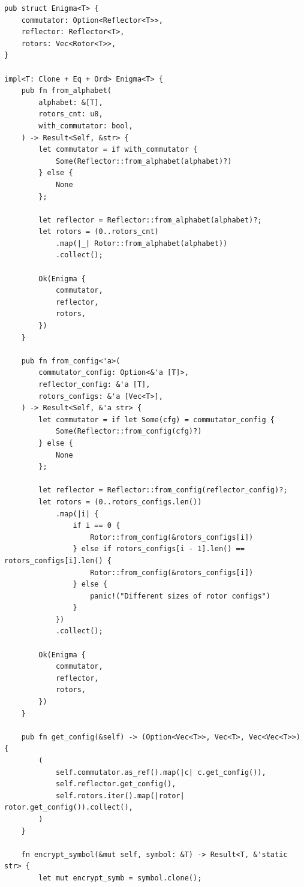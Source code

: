 \begin{center}
\captionsetup{justification=raggedright,singlelinecheck=off}
\begin{lstlisting}[label=lst:enigma,caption=реализация Энигмы]
pub struct Enigma<T> {
    commutator: Option<Reflector<T>>,
    reflector: Reflector<T>,
    rotors: Vec<Rotor<T>>,
}

impl<T: Clone + Eq + Ord> Enigma<T> {
    pub fn from_alphabet(
        alphabet: &[T],
        rotors_cnt: u8,
        with_commutator: bool,
    ) -> Result<Self, &str> {
        let commutator = if with_commutator {
            Some(Reflector::from_alphabet(alphabet)?)
        } else {
            None
        };

        let reflector = Reflector::from_alphabet(alphabet)?;
        let rotors = (0..rotors_cnt)
            .map(|_| Rotor::from_alphabet(alphabet))
            .collect();

        Ok(Enigma {
            commutator,
            reflector,
            rotors,
        })
    }

    pub fn from_config<'a>(
        commutator_config: Option<&'a [T]>,
        reflector_config: &'a [T],
        rotors_configs: &'a [Vec<T>],
    ) -> Result<Self, &'a str> {
        let commutator = if let Some(cfg) = commutator_config {
            Some(Reflector::from_config(cfg)?)
        } else {
            None
        };

        let reflector = Reflector::from_config(reflector_config)?;
        let rotors = (0..rotors_configs.len())
            .map(|i| {
                if i == 0 {
                    Rotor::from_config(&rotors_configs[i])
                } else if rotors_configs[i - 1].len() == rotors_configs[i].len() {
                    Rotor::from_config(&rotors_configs[i])
                } else {
                    panic!("Different sizes of rotor configs")
                }
            })
            .collect();

        Ok(Enigma {
            commutator,
            reflector,
            rotors,
        })
    }

    pub fn get_config(&self) -> (Option<Vec<T>>, Vec<T>, Vec<Vec<T>>) {
        (
            self.commutator.as_ref().map(|c| c.get_config()),
            self.reflector.get_config(),
            self.rotors.iter().map(|rotor| rotor.get_config()).collect(),
        )
    }

    fn encrypt_symbol(&mut self, symbol: &T) -> Result<T, &'static str> {
        let mut encrypt_symb = symbol.clone();


\end{lstlisting}
\end{center}
